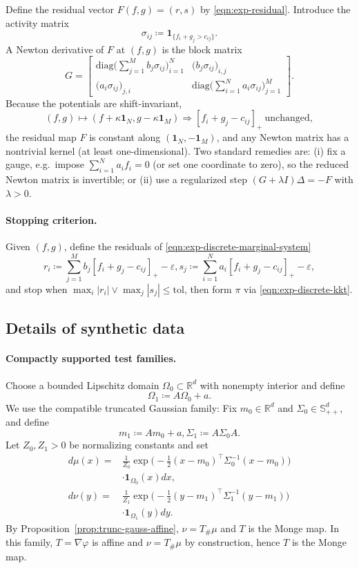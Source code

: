 \documentclass{article}
\theoremstyle{plain}
\theoremstyle{definition}
\theoremstyle{remark}
\numberwithin{equation}{section}
\newcommand{\R}{\mathbb{R}}
\begin{document}
Define the residual vector $F(f,g)=(r,s)$ by \eqref{eqn:exp-residual}.
Introduce the activity matrix
$$
\sigma_{ij}\coloneqq\mathbf1_{\{f_i+g_j>c_{ij}\}}.
$$
A Newton derivative of $F$ at $(f,g)$ is the block matrix
\begin{equation}\label{eqn:exp-ssn-jac}
G=
\begin{bmatrix}
\mathrm{diag}\Big(\sum_{j=1}^Mb_j\sigma_{ij}\Big)_{i=1}^N&\big(b_j\sigma_{ij}\big)_{i,j}\\
\big(a_i\sigma_{ij}\big)_{j,i}&\mathrm{diag}\Big(\sum_{i=1}^Na_i\sigma_{ij}\Big)_{j=1}^M
\end{bmatrix}.
\end{equation}
Because the potentials are shift-invariant,
$$
(f,g)\mapsto(f+\kappa\mathbf1_N,g-\kappa\mathbf1_M)\Rightarrow[f_i+g_j-c_{ij}]_+\ \text{unchanged},
$$
the residual map $F$ is constant along $(\mathbf1_N,-\mathbf1_M)$, and any Newton matrix has a nontrivial kernel (at least one-dimensional). 
Two standard remedies are: (i) fix a gauge, e.g.\ impose $\sum_{i=1}^N a_i f_i=0$ (or set one coordinate to zero), so the reduced Newton matrix is invertible; 
or (ii) use a regularized step $(G+\lambda I)\Delta=-F$ with $\lambda>0$.

\paragraph{Stopping criterion.}
Given $(f,g)$, define the residuals of \eqref{eqn:exp-discrete-marginal-system}
\begin{equation}\label{eqn:exp-residual}
r_i\coloneqq\sum_{j=1}^Mb_j[f_i+g_j-c_{ij}]_+-\varepsilon,
s_j\coloneqq\sum_{i=1}^Na_i[f_i+g_j-c_{ij}]_+-\varepsilon,
\end{equation}
and stop when $\max_i|r_i|\vee\max_j|s_j|\le\mathrm{tol}$, then form $\pi$ via \eqref{eqn:exp-discrete-kkt}.
\subsection{Details of synthetic data}\label{sec:exp-synthetic-data}
\paragraph{Compactly supported test families.}
Choose a bounded Lipschitz domain $\Omega_0\subset\R^d$ with nonempty interior and define
$$
\Omega_1\coloneqq A\Omega_0+a.
$$
We use the compatible truncated Gaussian family: Fix $m_0\in\R^d$ and $\Sigma_0\in\mathbb S_{++}^d$, and define
$$
m_1\coloneqq Am_0+a,\Sigma_1\coloneqq A\Sigma_0A.
$$
Let $Z_0,Z_1>0$ be normalizing constants and set
$$
\begin{aligned}
d\mu(x)=&\frac{1}{Z_0}\exp\Big(-\frac12(x-m_0)^\top\Sigma_0^{-1}(x-m_0)\Big)\nonumber\\
&\cdot\mathbf1_{\Omega_0}(x)dx,\\
d\nu(y)=&\frac{1}{Z_1}\exp\Big(-\frac12(y-m_1)^\top\Sigma_1^{-1}(y-m_1)\Big)\nonumber\\
&\cdot\mathbf1_{\Omega_1}(y)dy.
\end{aligned}
$$
By Proposition~\ref{prop:trunc-gauss-affine}, $\nu=T_\#\mu$ and $T$ is the Monge map.
In this family, $T=\nabla\varphi$ is affine and $\nu=T_\#\mu$ by construction, hence $T$ is the Monge map.
\end{document}

